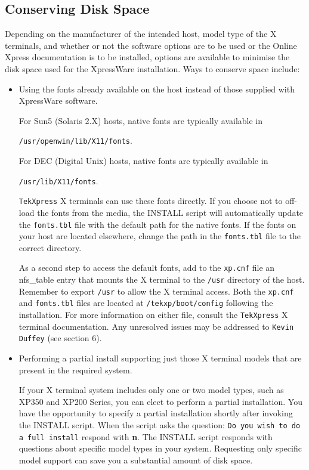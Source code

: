 \subsection {Conserving Disk Space}

Depending on the manufacturer of the intended host, model type of the X
terminals, and whether or not the software options are to be used or the Online
Xpress documentation is to be installed, options are available to minimise the
disk space used for the XpressWare installation. Ways to conserve space
include:

\begin {itemize}

\item Using the fonts already available on the host instead of those supplied
with XpressWare software.

For Sun5 (Solaris 2.X) hosts, native fonts are typically available in

{\tt /usr/openwin/lib/X11/fonts}.

For DEC (Digital Unix) hosts, native fonts are typically available in

{\tt /usr/lib/X11/fonts}.

{\tt TekXpress} X terminals can use these fonts directly. If you choose not to
off-load the fonts from the media, the INSTALL script will automatically update
the {\tt fonts.tbl} file with the default path for the native fonts. If the
fonts on your host are located elsewhere, change the path in the {\tt fonts.tbl}
file to the correct directory.

As a second step to access the default fonts, add to the {\tt xp.cnf} file an
nfs\_table entry that mounts the X terminal to the {\tt /usr} directory of the
host. Remember to export {\tt /usr} to allow the X terminal access. Both the
{\tt xp.cnf} and {\tt fonts.tbl} files are located at {\tt /tekxp/boot/config}
following the installation. For more information on either file, consult the
{\tt TekXpress} X terminal documentation. Any unresolved issues may be addressed
to {\tt Kevin Duffey} (see section 6).

\item Performing a partial install supporting just those X terminal models that
are present in the required system.

If your X terminal system includes only one or two model types, such as XP350
and XP200 Series, you can elect to perform a partial installation. You have the
opportunity to specify a partial installation shortly after invoking the INSTALL
script. When the script asks the question: {\tt Do you wish to do a full install}
respond with {\bf n}. The INSTALL script responds with questions about specific
model types in your system. Requesting only specific model support can save you
a substantial amount of disk space.


\end{itemize}
